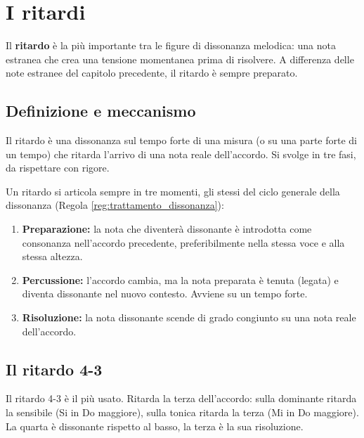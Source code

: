 \chapter{I ritardi}
\label{chap:ritardi}

Il \textbf{ritardo} è la più importante tra le figure di dissonanza melodica: una nota estranea che crea una tensione momentanea prima di risolvere. A differenza delle note estranee del capitolo precedente, il ritardo è sempre preparato.

\section{Definizione e meccanismo}
\label{sec:definizione_ritardo}

Il ritardo è una dissonanza sul tempo forte di una misura (o su una parte forte di un tempo) che ritarda l'arrivo di una nota reale dell'accordo. Si svolge in tre fasi, da rispettare con rigore.

\begin{definizione}
	\label{def:fasi_ritardo}
	Un ritardo si articola sempre in tre momenti, gli stessi del ciclo generale della dissonanza (Regola \ref{reg:trattamento_dissonanza}):
	\begin{enumerate}
		\item \textbf{Preparazione:} la nota che diventerà dissonante è introdotta come consonanza nell'accordo precedente, preferibilmente nella stessa voce e alla stessa altezza.
		\item \textbf{Percussione:} l'accordo cambia, ma la nota preparata è tenuta (legata) e diventa dissonante nel nuovo contesto. Avviene su un tempo forte.
		\item \textbf{Risoluzione:} la nota dissonante scende di grado congiunto su una nota reale dell'accordo.
	\end{enumerate}
\end{definizione}

\section{Il ritardo 4-3}
\label{sec:ritardo_4_3}

Il ritardo 4-3 è il più usato. Ritarda la terza dell'accordo: sulla dominante ritarda la sensibile (Si in Do maggiore), sulla tonica ritarda la terza (Mi in Do maggiore). La quarta è dissonante rispetto al basso, la terza è la sua risoluzione.

